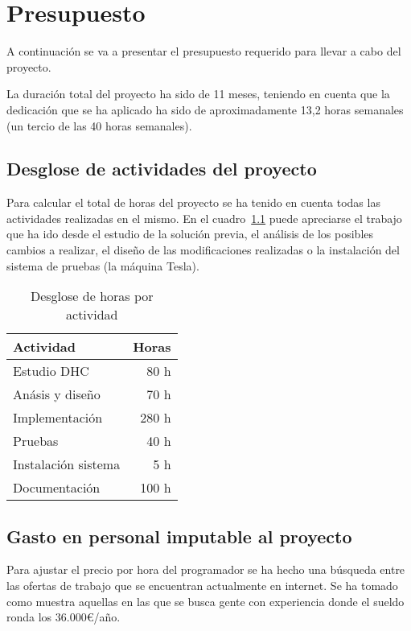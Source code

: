 \chapter{Presupuesto}

A continuación se va a presentar el presupuesto requerido para llevar a cabo del proyecto.

La duración total del proyecto ha sido de 11 meses, teniendo en cuenta que la dedicación que se ha aplicado ha sido de aproximadamente 13,2 horas semanales (un tercio de las 40 horas semanales).

\section{Desglose de actividades del proyecto}

Para calcular el total de horas del proyecto se ha tenido en cuenta todas las actividades realizadas en el mismo. En el cuadro~\ref{tab:des_horas} puede apreciarse el trabajo que ha ido desde el estudio de la solución previa, el análisis de los posibles cambios a realizar, el diseño de las modificaciones realizadas o la instalación del sistema de pruebas (la máquina Tesla).

\begin{table}
	\centering
	
	\begin{tabular}{|l|r|}
		\hline
		Actividad & Horas \\
		\hline
		Estudio DHC & 80 h \\
		\hline
		Anásis y diseño & 70 h \\
		\hline
		Implementación & 280 h \\
		\hline
		Pruebas & 40 h \\
		\hline
		Instalación sistema & 5 h \\
		\hline
		Documentación & 100 h \\
		\hline
	\end{tabular}
	\caption{Desglose de horas por actividad}\label{tab:des_horas}
\end{table}

\section{Gasto en personal imputable al proyecto}

Para ajustar el precio por hora del programador se ha hecho una búsqueda entre las ofertas de trabajo que se encuentran actualmente en internet. Se ha tomado como muestra aquellas en las que se busca gente con experiencia donde el sueldo ronda los 36.000\euro/año.

